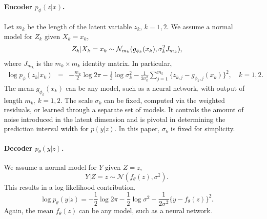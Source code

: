 \documentclass{article}
\begin{document}
\paragraph{Encoder $p_{\phi}(z|x)$.} Let $m_k$ be the length of the latent variable $z_k$, $k=1,2$. We assume a normal model for $Z_k$ given $X_k=x_k$,
\begin{equation}
\label{eqn:compute_z}
Z_k | X_k=x_k \sim {\cal N}_{m_k}(g_{\phi_k}(x_k), \sigma_{k}^2 J_{m_k}),
\end{equation} 
where $J_{m_k}$ is the $m_k\times m_k$ identity matrix. In particular,
\begin{eqnarray}
\log p_\phi(z_k|x_k) &=& -\frac{m_k}{2}\log 2\pi - \frac{1}{2}\log \sigma_k^2 - \frac{1}{2\sigma_k^2} \sum_{j=1}^{m_k} \{z_{k,j} - g_{\phi_k,j}(x_k)\}^2, \quad k=1,2.
\end{eqnarray}
The mean $g_{\phi_k}(x_k)$ can be any model, such as a neural network, with output of length $m_k$, $k=1,2$. The scale $\sigma_{k}$ can be fixed, computed via the weighted residuals, or learned through a separate set of models. It controls the amount of noise introduced in the latent dimension and is pivotal in determining the prediction interval width for $p(y|z)$. In this paper, $\sigma_{k}$ is fixed for simplicity. 


\paragraph{Decoder $p_{\theta}(y|z)$.}
We assume a normal model for $Y$ given $Z=z$,
\begin{equation}
\label{eqn:y_given_z}
    Y | Z=z \sim \mathcal{N}(f_\theta(z), \sigma^2).
\end{equation}
This results in a log-likelihood contribution,
\begin{equation}
\label{eqn:p_theta_llk}
    \log p_{\theta}(y|z) = -\frac{1}{2}\log 2\pi - \frac{1}{2}\log \sigma^2 - \frac{1}{2\sigma^2} \{y-f_\theta(z)\}^2.
\end{equation}
Again, the mean $f_\theta(z)$ can be any model, such as a neural network. 
\end{document}
